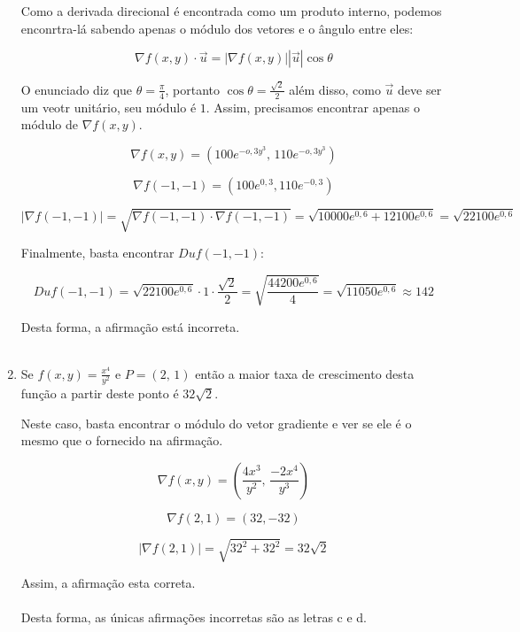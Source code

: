 \begin{enumerate}
	\solucao
	
	Como a derivada direcional é encontrada como um produto interno,
	podemos enconrtra-lá sabendo apenas o módulo dos vetores e o ângulo entre eles:
	
	$$\nabla f(x, y) \cdot \vec{u} = |\nabla f(x, y)||\vec{u}|\cos \theta$$
	
	O enunciado diz que $\theta = \frac{\pi}{4}$, portanto $\cos \theta = \frac{\sqrt{2}}{2}$
	além disso, como $\vec{u}$ deve ser um veotr unitário, seu módulo é $1$. Assim, precisamos
	encontrar apenas o módulo de $\nabla f(x, y)$.
	
	$$
	\nabla f(x, y) = \left( 100e^{-o,3y^3}, \, 110e^{-o,3y^3} \right)
	$$
	
	$$
	\nabla f(-1, -1) = \left(100 e^{0,3}, 110e^{-0,3} \right)
	$$
	
	$$
	| \nabla f(-1, -1) | = \sqrt{\nabla f(-1, -1) \cdot \nabla f(-1, -1)} =
	\sqrt{10000e^{0,6} + 12100e^{0,6}} = 
	\sqrt{22100e^{0,6}}
	$$
	
	Finalmente, basta encontrar $Du f(-1, -1)$:
	
	$$
	Du f(-1, -1) = \sqrt{22100e^{0,6}} \cdot 1 \cdot \frac{\sqrt{2}}{2} =
	\sqrt{\frac{44200e^{0,6}}{4}} = \sqrt{11050e^{0,6}} \approx 142
	$$
	
	Desta forma, a afirmação está incorreta.
	\\ \\
	\item Se $f(x, y) = \frac{x^4}{y^2}$ e $P = (2, \, 1)$ então a maior
	taxa de crescimento desta função a partir deste ponto é $32\sqrt{2}$.
	
	\solucao
	
	Neste caso, basta encontrar o módulo do vetor gradiente e ver se ele é o
	mesmo que o fornecido na afirmação.
	
	$$
	\nabla f(x, y) = \left( \frac{4x^3}{y^2}, \, \frac{-2x^4}{y^3}\right)
	$$
	
	$$
	\nabla f(2, 1) = \left( 32, -32 \right)
	$$
	
	$$
	|\nabla f(2, 1)| = \sqrt{32^2 + 32^2} = 32\sqrt{2}
	$$
	
	Assim, a afirmação esta correta.
	\\ \\
	Desta forma, as únicas afirmações incorretas são as letras c e d.

\end{enumerate}
